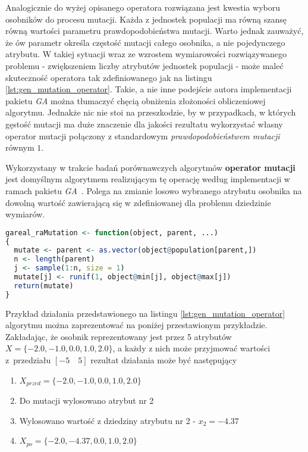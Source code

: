 \par
Analogicznie do wyżej opisanego operatora rozwiązana jest kwestia wyboru osobników do procesu mutacji. Każda z jednostek populacji ma równą szansę równą wartości parametru prawdopodobieństwa mutacji. Warto jednak zauważyć, że ów parametr określa częstość mutacji całego osobnika, a nie pojedynczego atrybutu. W takiej sytuacji wraz ze wzrostem wymiarowości rozwiązywanego problemu - zwiększeniem liczby atrybutów jednostek populacji - może maleć skuteczność operatora tak zdefiniowanego jak na listingu \ref{lst:gen_mutation_operator}. Takie, a nie inne podejście autora implementacji pakietu \emph{GA} można tłumaczyć chęcią obniżenia złożoności obliczeniowej algorytmu. Jednakże nic nie stoi na przeszkodzie, by w przypadkach, w których gęstość mutacji ma duże znaczenie dla jakości rezultatu wykorzystać własny operator mutacji połączony z standardowym \emph{prawdopodobieństwem mutacji} równym $1$.


\par
Wykorzystany w trakcie badań porównawczych algorytmów \textbf{operator mutacji} jest domyślnym algorytmem realizującym tę operację według implementacji w ramach pakietu \emph{GA}~\cite{gaPackage}. Polega na zmianie losowo wybranego atrybutu osobnika na dowolną wartość zawierającą się w zdefiniowanej dla problemu dziedzinie wymiarów. 
\begin{lstlisting}[caption=Zastosowany operator mutacji z pakietu \emph{GA} dla języka \emph{R}, label=lst:gen_mutation_operator, mathescape, breaklines=true, language=R]
gareal_raMutation <- function(object, parent, ...)
{
  mutate <- parent <- as.vector(object@population[parent,])
  n <- length(parent)
  j <- sample(1:n, size = 1)
  mutate[j] <- runif(1, object@min[j], object@max[j])
  return(mutate)
}
\end{lstlisting}
Przykład działania przedstawionego na listingu \ref{lst:gen_mutation_operator} algorytmu można zaprezentować na poniżej przestawionym przykładzie. Zakładając, że osobnik reprezentowany jest przez 5 atrybutów $X=\lbrace-2.0,-1.0,0.0,1.0,2.0\rbrace$, a każdy z nich może przyjmować wartości z~przedziału $[-5\quad5]$ rezultat działania może być następujący
\begin{enumerate}
\item $X_{przed}=\lbrace-2.0,-1.0,0.0,1.0,2.0\rbrace$
\item Do mutacji wylosowano atrybut nr 2
\item Wylosowano wartość z dziedziny atrybutu nr 2 - $x_2=-4.37$
\item $X_{po}=\lbrace-2.0,-4.37,0.0,1.0,2.0\rbrace$
\end{enumerate}


